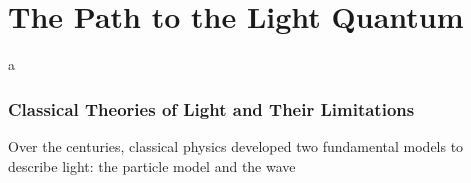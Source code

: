 \chapter{The Path to the Light Quantum}


a

\subsection{Classical Theories of Light and Their Limitations}

Over the centuries, classical physics developed two fundamental models to describe light: the particle model and the wave 